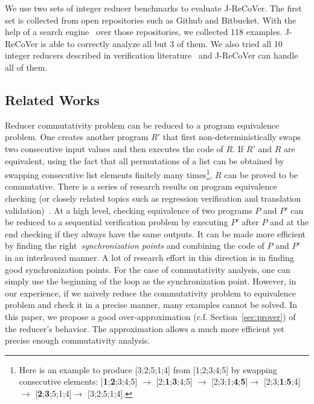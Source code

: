 \documentclass{llncs}
\begin{document}
We use two sets of integer reducer benchmarks to evaluate J-ReCoVer. The first set is collected from open repositories such as Github and Bitbucket. With the help of a search engine~\cite{searchcode} over those repositories, we collected 118 examples. J-ReCoVer is able to correctly analyze all but 3 of them. We also tried all 10 integer reducers described in verification literature~\cite{ChenHSW15,ChenSW16} and J-ReCoVer can handle all of them.


\subsection*{Related Works}
Reducer commutativity problem can be reduced to a program equivalence problem. One creates another program $R'$ that first non-deterministically swaps two consecutive input values and then executes the code of $R$. If $R'$ and $R$ are equivalent, using the fact that all permutations of a list can be obtained by swapping consecutive list elements finitely many times\footnote{Here is an example to produce [3;2;5;1;4] from [1;2;3;4;5] by swapping consecutive elements: [\textbf{1};\textbf{2};3;4;5] $\rightarrow$ [2;\textbf{1};\textbf{3};4;5] $\rightarrow$ [2;3;1;\textbf{4};\textbf{5}]$\rightarrow$ [2;3;\textbf{1};\textbf{5};4]$\rightarrow$ [\textbf{2};\textbf{3};5;1;4]$\rightarrow$ [3;2;5;1;4].}, $R$ can be proved to be commutative. There is a series of research results on program equivalence checking (or closely related topics such as regression verification and translation validation)~\cite{Pnueli:1998:TV,symdiff,fedyukovich2015automated,sharma2013data,godlin2009regression,fedyukovich2016property,felsing2014automating,KieferKlebanovUlbrich2017,lahiri2013differential,grossman2017verifying,barthe2011relational,KlebanovRuemmerUlbrich2017}. At a high level, checking equivalence of two programs $P$ and $P'$ can be reduced to a sequential verification problem by executing $P'$ after $P$ and at the end checking if they always have the same outputs. It can be made more efficient by finding the right~\emph{synchronization points} and combining the code of $P$ and $P'$ in an interleaved manner. A lot of research effort in this direction is in finding good synchronization points. For the case of commutativity analysis, one can simply use the beginning of the loop as the synchronization point. However, in our experience, if we naively reduce the commutativity problem to equivalence problem and check it in a precise manner, many examples cannot be solved. In this paper, we propose a good over-approximation (c.f. Section~\ref{sec:prover}) of the reducer's behavior. The approximation allows a much more efficient yet precise enough commutativity analysis.
\end{document}
